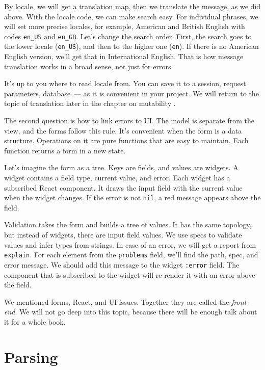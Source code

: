 
By locale, we will get a translation map, then we translate the message, as we did above. With the locale code, we can make search easy. For individual phrases, we will set more precise locales, for example, American and British English with codes \verb|en_US| and \verb|en_GB|. Let's change the search order. First, the search goes to the lower locale (\verb|en_US|), and then to the higher one (\verb|en|). If there is no American English version, we'll get that in International English. That is how message translation works in a broad sense, not just for errors.

It's up to you where to read locale from.  You can save it to a session, request parameters, database~--- as it is convenient in your project. We will return to the topic of translation later in the chapter on mutability .

The second question is how to link errors to UI. The model is separate from the view, and the forms follow this rule. It's convenient when the form is a data structure. Operations on it are pure functions that are easy to maintain. Each function returns a form in a new state.

Let's imagine the form as a tree. Keys are fields, and values are widgets. A widget contains a field type, current value, and error. Each widget has a subscribed React component. It draws the input field with the current value when the widget changes. If the error is not \verb|nil|, a red message appears above the field.

Validation takes the form and builds a tree of values. It has the same topology, but instead of widgets, there are input field values. We use specs to validate values and infer types from strings. In case of an error, we will get a report from \verb|explain|. For each element from the \verb|problems| field, we'll find the path, spec, and error message. We should add this message to the widget \verb|:error| field. The component that is subscribed to the widget will re-render it with an error above the field.


We mentioned forms, React, and UI issues. Together they are called the \emph{front-end}. We will not go deep into this topic, because there will be enough talk about it for a whole book.

\section{Parsing}

